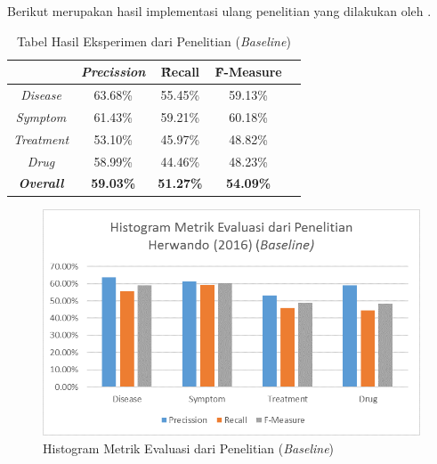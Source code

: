 Berikut merupakan hasil implementasi ulang penelitian yang dilakukan oleh \cite{skripsiKakRadit}.
	
\begin{table}
	\centering
	\caption{Tabel Hasil Eksperimen dari Penelitian \cite{skripsiKakRadit} (\textit{Baseline})}
	\begin{tabular}{|c|c|c|c|c|}
		\hline
							& \textit{Precission} & \f{\f{Recall}} & \f{\f{F-Measure}} \\ \hline
		\textit{Disease}    & 63.68\%             & 55.45\%        & 59.13\%           \\ \hline
		\textit{Symptom}    & 61.43\%             & 59.21\%        & 60.18\%           \\ \hline
		\textit{Treatment}  & 53.10\%             & 45.97\%        & 48.82\%           \\ \hline
		\textit{Drug}		& 58.99\%             & 44.46\%        & 48.23\%           \\ \hline
		\textit{\textbf{Overall}}&\textbf{59.03\%}  & \textbf{51.27\%}& \textbf{54.09\%} \\ \hline
	    \end{tabular}
\label{table:radit}
\end{table}

\begin{figure}
	\centering
	\includegraphics[width=0.85\linewidth]{images/radit}
	\caption{Histogram Metrik Evaluasi dari Penelitian \cite{skripsiKakRadit} (\textit{Baseline})}
	\label{fig:radit}
\end{figure}

